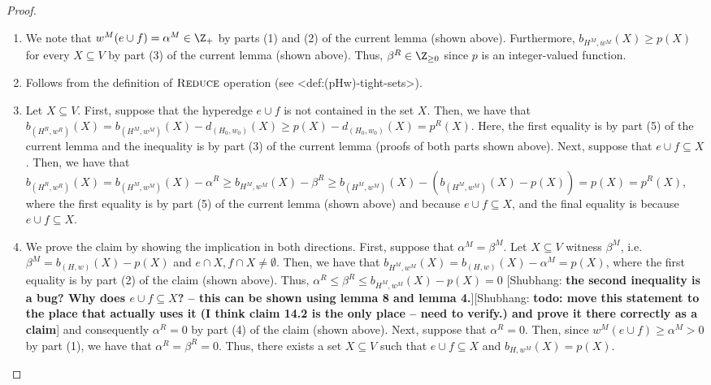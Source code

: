 \documentclass{article}
\def\Cref#1{<#1>}%
\newcommand{\tightSetFamily}[1]{\ensuremath{T_{#1}}\xspace}
\newcommand{\shubhang}[1]{{\color{blue}[{\tiny Shubhang: \bf #1}]\marginpar{\color{blue}*}}}
\newcommand{\maximalTightSetContainingHyperedge}[1]{\ensuremath{\tau_{#1}}\xspace}
\newcommand{\reduce}{\ensuremath{\textsc{Reduce}}\xspace}
\begin{document}
\begin{proof}
\begin{enumerate}
    \item We note that $w^M(e\cup f) = \alpha^M \in \Z_+$ by parts (1) and (2) of the current lemma (shown above). Furthermore, $b_{H^M,w^M}(X) \geq p(X)$ for every $X\subseteq V$ by part (3) of the current lemma (shown above). Thus, $\beta^R \in \Z_{\geq 0}$ since $p$ is an integer-valued function.

    \item Follows from the definition of \reduce operation (see \Cref{def:(pHw)-tight-sets}).

    \item Let $X\subseteq V$. First, suppose that the hyperedge $e\cup f$ is not contained in the set $X$. 
    Then, we have that $b_{(H^R, w^R)}(X) = b_{(H^M, w^M)}(X) - d_{(H_0, w_0)}(X) \geq p(X) - d_{(H_0, w_0)}(X) = p^R(X)$. Here, the first equality is by part (5) of the current lemma and the inequality is by part (3) of the current lemma (proofs of both parts shown above).  Next, suppose that $e\cup f \subseteq X$. Then, we have that $b_{(H^R, w^R)}(X) = b_{(H^M, w^M)}(X) - \alpha^R \geq b_{H^M,w^M}(X) - \beta^R \geq b_{(H^M, w^M)}(X) - (b_{(H^M, w^M)}(X) - p(X)) = p(X) = p^R(X)$, where the first equality is by part (5) of the current lemma (shown above) and because $e\cup f \subseteq X$, and the final equality is because $e\cup f \subseteq X$.
\iffalse
    \item We prove the claim by showing the implication in both directions.
    First, suppose that $\alpha^M = \beta^M$. Let $X \subseteq V$ witness $\beta^M$, i.e. $\beta^M = b_{(H,w)}(X) - p(X)$ and $e\cap X, f\cap X \not = \emptyset$. Then, we have that
    $b_{H^M,w^M}(X) = b_{(H,w)}(X) - \alpha^M = p(X)$, where the first equality is by part (2) of the claim (shown above). Thus, $\alpha^R \leq \beta^R \leq b_{H^M,w^M}(X) - p(X) = 0$ \shubhang{the second inequality is a bug? Why does $e\cup f \subseteq X$? -- this can be shown using lemma 8 and lemma 4.}\shubhang{todo: move this statement to the place that actually uses it (I think claim 14.2 is the only place -- need to verify.) and prove it there correctly as a claim} and consequently $\alpha^R = 0$ by part (4) of the claim (shown above). Next, suppose that $\alpha^R = 0$. Then, since $w^M(e\cup f) \geq \alpha^M > 0$ by part (1), we have that $\alpha^R = \beta^R = 0$. Thus, there exists a set $X \subseteq V$ such that $e\cup f \subseteq X$ and $b_{H,w^M}(X) = p(X)$. 

\end{enumerate}
\end{proof}
\end{document}

